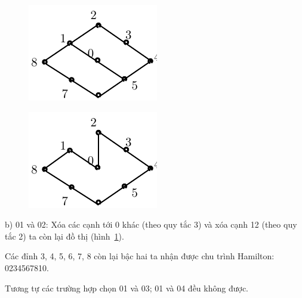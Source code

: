 \documentclass[11pt]{article}
\begin{document}
\begin{shortanswer}[title={\relax}, rearrange=no]
\begin{question}
\begin{answer}
\begin{figure}[!ht]
\begin{minipage}[b]{5cm}
\centering
\includegraphics[scale =0.8]{hamilton1}
\caption{}\protect\label{fig:hin}
\end{minipage}
\hfill
\begin{minipage}[b]{6cm}
\centering
\includegraphics[scale =0.8]{hamilton2}
\caption{}\label{fig:hình3}
\end{minipage}
\end{figure}
b) 01 và 02: Xóa các cạnh tới 0 khác (theo quy tắc 3) và xóa cạnh 12 (theo quy tắc 2) ta còn lại đồ thị (hình~\ref{fig:hình3}).

Các đỉnh 3, 4, 5, 6, 7, 8 còn lại bậc hai ta nhận được chu trình Hamilton: 0234567810.

Tương tự các trường hợp chọn 01 và 03; 01 và 04 đều không được.
\end{answer}
\end{question}




\end{shortanswer}
\end{document}
